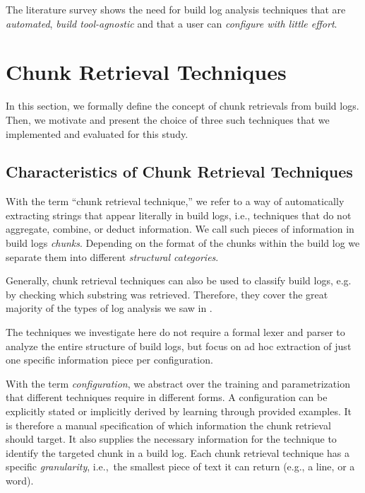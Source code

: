 \documentclass[10pt,journal,compsoc]{IEEEtran}
\begin{document}
The literature survey shows the need for
build log
analysis techniques that are \emph{automated},
\emph{build tool-agnostic}
and that a user can \emph{configure with little effort}.
\section{Chunk Retrieval Techniques}
\label{sec:techniques}

In this section, we formally define the concept of chunk
retrievals from build logs.
Then, we motivate and present the choice of three such techniques that
we implemented and evaluated for this study.

\subsection{Characteristics of Chunk Retrieval Techniques}
\label{sec:crt-characteristics}

With the term ``chunk retrieval technique,'' we refer to a way of
automatically extracting strings that appear literally in build
logs, i.e., techniques that do not aggregate, combine, or deduct
information.
We call such pieces of information in build logs
\emph{chunks}.
Depending on the format of the chunks within the build log we
separate them into different \emph{structural categories}.

Generally, chunk retrieval techniques
can also be used to classify build logs, e.g.\, by checking
which substring was retrieved.
Therefore, they
cover the great majority of the types of log analysis we saw in
.

The techniques we investigate here do not require a formal lexer and
parser to analyze the entire structure of build logs, but focus on
ad hoc extraction of just one specific information piece per
configuration.

With the term \textit{configuration}, we abstract over the training
and parametrization that different techniques require in different
forms.
A configuration can be explicitly stated or implicitly derived
by learning through provided examples.
It is therefore a manual
specification of which information the chunk retrieval should target.
It also supplies the necessary information for the technique to
identify the targeted chunk in a build log.
Each chunk
retrieval technique has a specific \textit{granularity}, i.e.,\ the
smallest piece of text it can return (e.g., a line, or a word).
\end{document}
